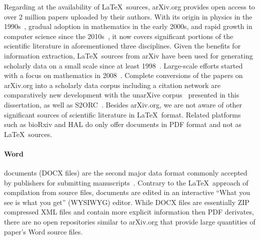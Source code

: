 Regarding at the availability of \LaTeX\ sources, arXiv.org provides open access to over 2 million papers uploaded by their authors. With its origin in physics in the 1990s~\cite{Feder2021,Ginsparg2011a}, gradual adoption in mathematics in the early 2000s, and rapid growth in computer science since the 2010s~\cite{Saier2023unarXive}, it now covers significant portions of the scientific literature in aforementioned three disciplines. Given the benefits for information extraction, \LaTeX\ sources from arXiv have been used for generating scholarly data on a small scale since at least 1998~\cite{Nanba1998}. Large-scale efforts started with a focus on mathematics in 2008~\cite{Stamerjohanns2008}. Complete conversions of the papers on arXiv.org into a scholarly data corpus including a citation network are comparatively new development with the unarXive corpus~\cite{Saier2020} presented in this dissertation, as well as S2ORC~\cite{Lo2020}.
Besides arXiv.org, we are not aware of other significant sources of scientific literature in \LaTeX\ format. Related platforms such as bioRxiv and HAL do only offer documents in PDF format and not as \LaTeX\ sources.




\paragraph{Word}
documents (DOCX files) are the second major data format commonly accepted by publishers for submitting manuscripts~\cite{Johnson2018stm}. Contrary to the \LaTeX\ approach of compilation from source files, documents are edited in an interactive ``What you see is what you get'' (WYSIWYG) editor. While DOCX files are essentially ZIP compressed XML files and contain more explicit information then PDF derivates, there are no open repositories similar to arXiv.org that provide large quantities of paper's Word source files.  %

